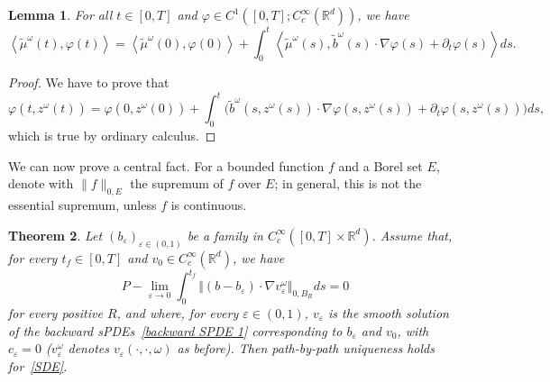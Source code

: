 \documentclass[a4paper,10pt]{article}
\newtheorem{theorem}{Theorem}[section]
\newtheorem{lemma}[theorem]{Lemma}
\newcommand\1{\mathbbm{1}}
\newcommand{\eps}{\varepsilon}
\numberwithin{equation}{section}
\begin{document}
\begin{lemma}
\label{lemma_equation_mu_tilde}
For all $t\in [0,T]$ and $\varphi\in C^{1}([0,T];C_{c}^{\infty}(\mathbb{R}^{d}))$, we have
\begin{equation*}
\left\langle \widetilde{\mu}^\omega(t)  ,\varphi(t) \right\rangle =\left\langle \widetilde{\mu}^\omega(0)  ,\varphi(  0)  \right\rangle +\int_{0}^{t}\left\langle
\widetilde{\mu}^\omega(s)  ,\widetilde{b}^\omega(s)  \cdot\nabla\varphi(s)  + \partial_t \varphi(s) \right\rangle ds .
\end{equation*}
\end{lemma}

\begin{proof}
We have to prove that
\begin{equation*}
\varphi(t,z^\omega(t))  =\varphi(0,z^\omega(0))  +\int_{0}^{t} \big( \widetilde{b}^\omega(s,z^\omega(s))  \cdot\nabla \varphi(s,z^\omega(s)) + \partial_t \varphi (s,z^\omega(s) )  \big)  ds ,
\end{equation*}
which is true by ordinary calculus.
\end{proof}

We can now prove a central fact. For a bounded function $f$ and a Borel set $E$, denote with $\|f\|_{0,E}$ the supremum of $f$ over $E$; in general, this is not the essential supremum, unless $f$ is continuous.

\begin{theorem}
\label{Theo sufficient for sDE}
Let $(b_{\eps})_{\eps\in (0,1)}$ be a family in $C_{c}^{\infty}([0,T] \times\mathbb{R}^{d})$. Assume that, for
every $t_{f}\in [0,T]  $ and $v_{0}\in C_{c}^{\infty} (\mathbb{R}^{d})$, we have 
\begin{equation}
P-\lim_{\eps\rightarrow0}\int_{0}^{t_{f}} \Vert (  b-b_{\eps}) \cdot\nabla v_{\eps}^\omega \Vert
_{0,B_R}ds=0 \label{main condition for sDE} 
\end{equation}
for every positive $R$, and where, for every $\eps\in(0,1)$, $v_{\eps}$ is the smooth solution of the backward sPDEs~\eqref{backward SPDE 1} corresponding to
$b_{\eps}$ and $v_{0}$, with $c_{\eps}=0$ \textup{(}$v_\eps^\omega$ denotes $v_\eps(\cdot,\cdot,\omega)$ as before\textup{)}. Then path-by-path uniqueness holds for~\eqref{SDE}.
\end{theorem}
\end{document}
